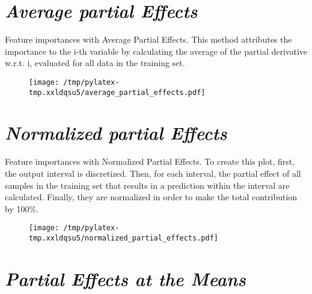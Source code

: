\documentclass{article}%
\begin{document}
%

            \chead{}
            \rhead{\today, \currenttime}
            
            \lfoot{}
            \cfoot{}
            \rfoot{\thepage\ | \pageref{LastPage}}
\section*{\textit{Average partial Effects}}%
\label{sec:textitAveragepartialEffects}%

                Feature importances with Average Partial Effects. This method
                attributes the importance to the i-th variable by calculating
                the average of the partial derivative w.r.t. i, evaluated for
                all data in the training set.

                \vfill%


\begin{figure}[H]%
\centering%
\texttt{[image: /tmp/pylatex-tmp.xxldqsu5/average\_partial\_effects.pdf]}%
\end{figure}

%
\vfill \pagebreak

%
\section*{\textit{Normalized partial Effects}}%
\label{sec:textitNormalizedpartialEffects}%

                Feature importances with Normalized Partial Effects. 
                To create this plot, first, the output interval is discretized.
                Then, for each interval, the partial effect of all samples
                in the training set that results in a prediction within the
                interval are calculated. Finally, they are normalized in
                order to make the total contribution by 100\%.

                \vfill%


\begin{figure}[H]%
\centering%
\texttt{[image: /tmp/pylatex-tmp.xxldqsu5/normalized\_partial\_effects.pdf]}%
\end{figure}

%
\vfill \pagebreak

%
\section*{\textit{Partial Effects at the Means}}%
\label{sec:textitPartialEffectsattheMeans}%
\end{document}
